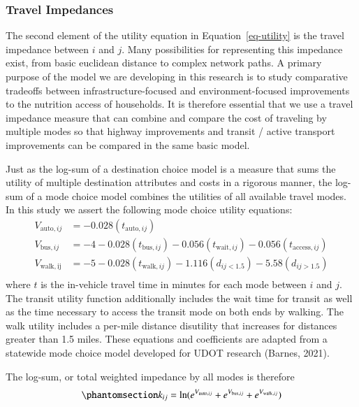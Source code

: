 \documentclass[
  letterpaper,
  number,
  review,
  3p]{elsarticle}
\begin{document}
\subsubsection{Travel Impedances}\label{sec-mcls}

The second element of the utility equation in Equation~\ref{eq-utility}
is the travel impedance between \(i\) and \(j\). Many possibilities for
representing this impedance exist, from basic euclidean distance to
complex network paths. A primary purpose of the model we are developing
in this research is to study comparative tradeoffs between
infrastructure-focused and environment-focused improvements to the
nutrition access of households. It is therefore essential that we use a
travel impedance measure that can combine and compare the cost of
traveling by multiple modes so that highway improvements and transit /
active transport improvements can be compared in the same basic model.

Just as the log-sum of a destination choice model is a measure that sums
the utility of multiple destination attributes and costs in a rigorous
manner, the log-sum of a mode choice model combines the utilities of all
available travel modes. In this study we assert the following mode
choice utility equations: \begin{align*} 
  V_{\mathrm{auto}, ij} &= -0.028(t_{\mathrm{auto}, ij})\\
  V_{\mathrm{bus}, ij} &= -4 -0.028(t_{\mathrm{bus}, ij}) -0.056(t_{\mathrm{wait}, ij}) -0.056(t_{\mathrm{access}, ij})\\
  V_{\mathrm{walk, ij}} &= -5 -0.028(t_{\mathrm{walk}, ij}) -1.116(d_{ij<1.5}) -5.58(d_{ij>1.5})\\
\end{align*} where \(t\) is the in-vehicle travel time in minutes for
each mode between \(i\) and \(j\). The transit utility function
additionally includes the wait time for transit as well as the time
necessary to access the transit mode on both ends by walking. The walk
utility includes a per-mile distance disutility that increases for
distances greater than 1.5 miles. These equations and coefficients are
adapted from a statewide mode choice model developed for UDOT research
(Barnes, 2021).

The log-sum, or total weighted impedance by all modes is therefore
\begin{equation}\phantomsection\label{eq-mcls}{
k_{ij} = \ln(e^{V_{\mathrm{auto}, ij}} + e^{V_{\mathrm{bus}, ij}} + e^{V_{\mathrm{walk},ij}})
}\end{equation}
\end{document}
